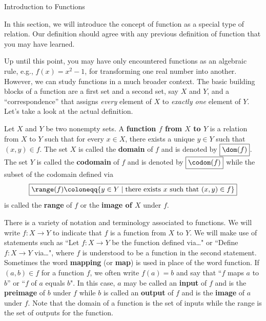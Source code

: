 \begin{section}{Introduction to Functions}

In this section, we will introduce the concept of function as a special type of relation.  Our definition should agree with any previous definition of function that you may have learned.

Up until this point, you may have only encountered functions as an algebraic rule, e.g., $f(x)=x^{2}-1$, for transforming one real number into another.  However, we can study functions in a much broader context.  The basic building blocks of a function are a first set and a second set, say $X$ and $Y$, and a ``correspondence'' that assigns \emph{every} element of $X$ to \emph{exactly one} element of $Y$.  Let's take a look at the actual definition.

\begin{definition}\label{def:function}
Let $X$ and $Y$ be two nonempty sets.  A \textbf{function $f$ from $X$ to $Y$} is a relation from $X$ to $Y$ such that for every $x\in X$, there exists a unique $y\in Y$ such that $(x,y)\in f$. The set $X$ is called the \textbf{domain} of $f$ and is denoted by $\boxed{\dom(f)}$.  The set $Y$ is called the \textbf{codomain} of $f$ and is denoted by $\boxed{\codom(f)}$ while the subset of the codomain defined via
\[
\boxed{\range(f)\coloneqq \{y\in Y\mid \mbox{there exists }x\mbox{ such that } (x,y)\in f\}}
\]
is called the \textbf{range} of $f$ or the \textbf{image of $X$} under $f$.
\end{definition}

There is a variety of notation and terminology associated to functions. We will write $\boxed{f:X\to Y}$ to indicate that $f$ is a function from $X$ to $Y$. We will make use of statements such as ``Let $f:X\to Y$ be the function defined via\ldots" or ``Define $f:X\to Y$ via\ldots", where $f$ is understood to be a function in the second statement. Sometimes the word \textbf{mapping} (or \textbf{map}) is used in place of the word function.  If $(a,b)\in f$ for a function $f$, we often write $\boxed{f(a)=b}$ and say that ``$f$ maps $a$ to $b$'' or ``$f$ of $a$ equals $b$". In this case, $a$ may be called an \textbf{input} of $f$ and is the \textbf{preimage} of $b$ under $f$ while $b$ is called an \textbf{output} of $f$ and is the \textbf{image} of $a$ under $f$. Note that the domain of a function is the set of inputs while the range is the set of outputs for the function.
 

\end{section}
